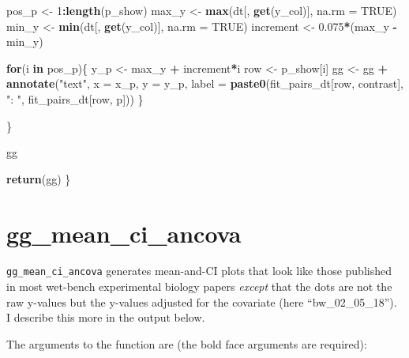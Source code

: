 \documentclass[]{book}
\newenvironment{Shaded}{\begin{snugshade}}{\end{snugshade}}
\newcommand{\ControlFlowTok}[1]{\textcolor[rgb]{0.13,0.29,0.53}{\textbf{#1}}}
\newcommand{\DataTypeTok}[1]{\textcolor[rgb]{0.13,0.29,0.53}{#1}}
\newcommand{\DecValTok}[1]{\textcolor[rgb]{0.00,0.00,0.81}{#1}}
\newcommand{\FloatTok}[1]{\textcolor[rgb]{0.00,0.00,0.81}{#1}}
\newcommand{\KeywordTok}[1]{\textcolor[rgb]{0.13,0.29,0.53}{\textbf{#1}}}
\newcommand{\NormalTok}[1]{#1}
\newcommand{\OperatorTok}[1]{\textcolor[rgb]{0.81,0.36,0.00}{\textbf{#1}}}
\newcommand{\OtherTok}[1]{\textcolor[rgb]{0.56,0.35,0.01}{#1}}
\newcommand{\StringTok}[1]{\textcolor[rgb]{0.31,0.60,0.02}{#1}}
\begin{document}
\begin{Shaded}
\begin{Highlighting}[]
\NormalTok{    pos_p <-}\StringTok{ }\DecValTok{1}\OperatorTok{:}\KeywordTok{length}\NormalTok{(p_show)}
\NormalTok{    max_y <-}\StringTok{ }\KeywordTok{max}\NormalTok{(dt[, }\KeywordTok{get}\NormalTok{(y_col)], }\DataTypeTok{na.rm =} \OtherTok{TRUE}\NormalTok{)}
\NormalTok{    min_y <-}\StringTok{ }\KeywordTok{min}\NormalTok{(dt[, }\KeywordTok{get}\NormalTok{(y_col)], }\DataTypeTok{na.rm =} \OtherTok{TRUE}\NormalTok{)}
\NormalTok{    increment <-}\StringTok{ }\FloatTok{0.075}\OperatorTok{*}\NormalTok{(max_y }\OperatorTok{-}\StringTok{ }\NormalTok{min_y)}

    \ControlFlowTok{for}\NormalTok{(i }\ControlFlowTok{in}\NormalTok{ pos_p)\{}
\NormalTok{      y_p <-}\StringTok{ }\NormalTok{max_y }\OperatorTok{+}\StringTok{ }\NormalTok{increment}\OperatorTok{*}\NormalTok{i}
\NormalTok{      row <-}\StringTok{ }\NormalTok{p_show[i]}
\NormalTok{    gg <-}\StringTok{ }\NormalTok{gg }\OperatorTok{+}\StringTok{ }\KeywordTok{annotate}\NormalTok{(}\StringTok{"text"}\NormalTok{,}
                        \DataTypeTok{x =}\NormalTok{ x_p,}
                        \DataTypeTok{y =}\NormalTok{ y_p,}
                        \DataTypeTok{label =} \KeywordTok{paste0}\NormalTok{(fit_pairs_dt[row, contrast],}
                                       \StringTok{": "}\NormalTok{,}
\NormalTok{                                       fit_pairs_dt[row, p]))}
\NormalTok{    \}}
    
   
\NormalTok{  \}}
  
    
    
  
  
\NormalTok{  gg}
  
  \KeywordTok{return}\NormalTok{(gg)}
\NormalTok{\}}
\end{Highlighting}
\end{Shaded}

\hypertarget{gg_mean_ci_ancova}{%
\section{gg\_mean\_ci\_ancova}\label{gg_mean_ci_ancova}}

\texttt{gg\_mean\_ci\_ancova} generates mean-and-CI plots that look like those published in most wet-bench experimental biology papers \emph{except} that the dots are not the raw y-values but the y-values adjusted for the covariate (here ``bw\_02\_05\_18''). I describe this more in the output below.

The arguments to the function are (the bold face arguments are required):
\end{document}
